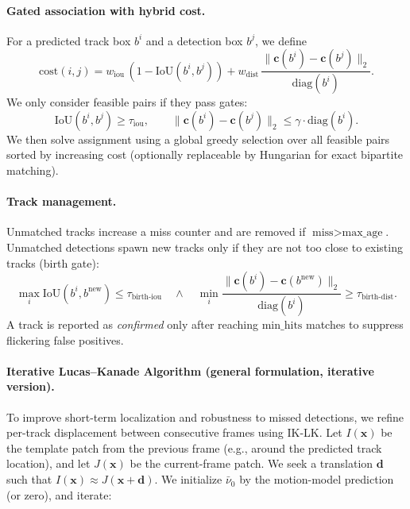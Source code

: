 \paragraph{Gated association with hybrid cost.}
For a predicted track box $b^i$ and a detection box $b^j$, we define
\begin{equation}
\text{cost}(i,j)=w_{\text{iou}}\,(1-\text{IoU}(b^i,b^j)) + w_{\text{dist}}\,\frac{\|\mathbf{c}(b^i)-\mathbf{c}(b^j)\|_2}{\text{diag}(b^i)}.
\end{equation}
We only consider feasible pairs if they pass gates:
\begin{equation}
\text{IoU}(b^i,b^j)\ge \tau_{\text{iou}},\qquad
\|\mathbf{c}(b^i)-\mathbf{c}(b^j)\|_2 \le \gamma\cdot \text{diag}(b^i).
\end{equation}
We then solve assignment using a global greedy selection over all feasible pairs sorted by increasing cost
(optionally replaceable by Hungarian for exact bipartite matching).

\paragraph{Track management.}
Unmatched tracks increase a miss counter and are removed if $\text{miss}>\text{max\_age}$.
Unmatched detections spawn new tracks only if they are not too close to existing tracks (birth gate):
\begin{equation}
\max_i \text{IoU}(b^i,b^{\text{new}}) \le \tau_{\text{birth-iou}}
\quad\wedge\quad
\min_i \frac{\|\mathbf{c}(b^i)-\mathbf{c}(b^{\text{new}})\|_2}{\text{diag}(b^i)} \ge \tau_{\text{birth-dist}}.
\end{equation}
A track is reported as \emph{confirmed} only after reaching $\text{min\_hits}$ matches to suppress flickering false positives.

\paragraph{Iterative Lucas--Kanade Algorithm (general formulation, iterative version).}
To improve short-term localization and robustness to missed detections, we refine per-track displacement between consecutive frames using IK-LK.
Let $I(\mathbf{x})$ be the template patch from the previous frame (e.g., around the predicted track location),
and let $J(\mathbf{x})$ be the current-frame patch. We seek a translation $\mathbf{d}$ such that
$I(\mathbf{x}) \approx J(\mathbf{x}+\mathbf{d})$.
We initialize $\bar{\nu}_0$ by the motion-model prediction (or zero), and iterate:

